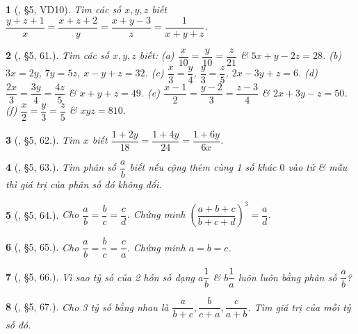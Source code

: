 \documentclass{article}
\newtheorem{baitoan}{}
\begin{document}
\begin{baitoan}[\cite{Binh_Toan_7_tap_1}, \S5, VD10]
	Tìm các số $x,y,z$ biết $\dfrac{y + z + 1}{x} = \dfrac{x + z + 2}{y} = \dfrac{x + y - 3}{z} = \dfrac{1}{x + y + z}$.
\end{baitoan}

\begin{baitoan}[\cite{Binh_Toan_7_tap_1}, \S5, 61.]
	Tìm các số $x,y,z$ biết: (a) $\dfrac{x}{10} = \dfrac{y}{10} = \dfrac{z}{21}$ \& $5x + y - 2z = 28$. (b) $3x = 2y$, $7y = 5z$, $x - y + z = 32$. (c) $\dfrac{x}{3} = \dfrac{y}{4}$, $\dfrac{y}{3} = \dfrac{z}{5}$, $2x - 3y + z = 6$. (d) $\dfrac{2x}{3} = \dfrac{3y}{4} = \dfrac{4z}{5}$ \& $x + y + z = 49$. (e) $\dfrac{x - 1}{2} = \dfrac{y - 2}{3} = \dfrac{z - 3}{4}$ \& $2x + 3y - z = 50$. (f) $\dfrac{x}{2} = \dfrac{y}{3} = \dfrac{z}{5}$ \& $xyz = 810$.	
\end{baitoan}

\begin{baitoan}[\cite{Binh_Toan_7_tap_1}, \S5, 62.]
	Tìm $x$ biết $\dfrac{1 + 2y}{18} = \dfrac{1 + 4y}{24} = \dfrac{1 + 6y}{6x}$.
\end{baitoan}

\begin{baitoan}[\cite{Binh_Toan_7_tap_1}, \S5, 63.]
	Tìm phân số $\dfrac{a}{b}$ biết nếu cộng thêm cùng 1 số khác $0$ vào tử \& mẫu thì giá trị của phân số đó không đổi.
\end{baitoan}

\begin{baitoan}[\cite{Binh_Toan_7_tap_1}, \S5, 64.]
	Cho $\dfrac{a}{b} = \dfrac{b}{c} = \dfrac{c}{d}$. Chứng minh $\left(\dfrac{a + b + c}{b + c + d}\right)^3 = \dfrac{a}{d}$.
\end{baitoan}

\begin{baitoan}[\cite{Binh_Toan_7_tap_1}, \S5, 65.]
	Cho $\dfrac{a}{b} = \dfrac{b}{c} = \dfrac{c}{a}$. Chứng minh $a = b = c$.
\end{baitoan}

\begin{baitoan}[\cite{Binh_Toan_7_tap_1}, \S5, 66.]
	Vì sao tỷ số của 2 hỗn số dạng $a\dfrac{1}{b}$ \& $b\dfrac{1}{a}$ luôn luôn bằng phân số $\dfrac{a}{b}$?
\end{baitoan}

\begin{baitoan}[\cite{Binh_Toan_7_tap_1}, \S5, 67.]
	Cho 3 tỷ số bằng nhau là $\dfrac{a}{b + c},\dfrac{b}{c + a},\dfrac{c}{a + b}$. Tìm giá trị của mỗi tỷ số đó.
\end{baitoan}
\end{document}
